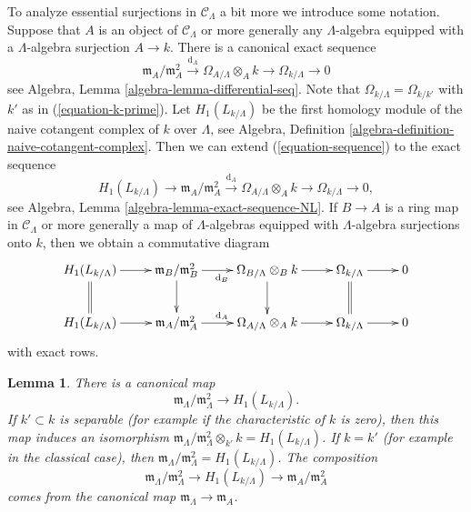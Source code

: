 \documentclass{stacks-project}
\theoremstyle{plain}
\newtheorem{lemma}[subsection]{Lemma}
\theoremstyle{definition}
\theoremstyle{remark}
\numberwithin{equation}{subsection}
\begin{document}
\noindent
To analyze essential surjections in $\mathcal{C}_\Lambda$ a bit more
we introduce some notation. Suppose that $A$ is an object
of $\mathcal{C}_\Lambda$ or more generally any $\Lambda$-algebra
equipped with a $\Lambda$-algebra surjection $A \to k$.
There is a canonical exact sequence
\begin{equation}
\label{equation-sequence}
\mathfrak m_A/\mathfrak m_A^2 \xrightarrow{\text{d}_A}
\Omega_{A/\Lambda} \otimes_A k \to
\Omega_{k/\Lambda} \to 0
\end{equation}
see
Algebra, Lemma \ref{algebra-lemma-differential-seq}.
Note that $\Omega_{k/\Lambda} = \Omega_{k/k'}$ with $k'$ as
in (\ref{equation-k-prime}). Let $H_1(L_{k/\Lambda})$
be the first homology module of the naive cotangent complex of $k$
over $\Lambda$, see
Algebra, Definition \ref{algebra-definition-naive-cotangent-complex}.
Then we can extend (\ref{equation-sequence})
to the exact sequence
\begin{equation}
\label{equation-sequence-extended}
H_1(L_{k/\Lambda}) \to
\mathfrak m_A/\mathfrak m_A^2 \xrightarrow{\text{d}_A}
\Omega_{A/\Lambda} \otimes_A k \to
\Omega_{k/\Lambda} \to 0,
\end{equation}
see
Algebra, Lemma \ref{algebra-lemma-exact-sequence-NL}.
If $B \to A$ is a ring map in $\mathcal{C}_\Lambda$
or more generally a map of $\Lambda$-algebras equipped
with $\Lambda$-algebra surjections onto $k$, then we obtain a
commutative diagram
\begin{equation}
\label{equation-sequence-functorial}
\vcenter{
\xymatrix{
H_1(L_{k/\Lambda}) \ar[r] \ar@{=}[d] &
\mathfrak m_B/\mathfrak m_B^2 \ar[r]_{\text{d}_B} \ar[d] &
\Omega_{B/\Lambda} \otimes_B k \ar[r] \ar[d] &
\Omega_{k/\Lambda} \ar[r] \ar@{=}[d] & 0 \\
H_1(L_{k/\Lambda}) \ar[r] &
\mathfrak m_A/\mathfrak m_A^2 \ar[r]^{\text{d}_A} &
\Omega_{A/\Lambda} \otimes_A k \ar[r] &
\Omega_{k/\Lambda} \ar[r] & 0
}
}
\end{equation}
with exact rows.

\begin{lemma}
\label{lemma-H1-separable-case}
There is a canonical map
$$
\mathfrak m_\Lambda/\mathfrak m_\Lambda^2 \longrightarrow H_1(L_{k/\Lambda}).
$$
If $k' \subset k$ is separable (for example if the characteristic
of $k$ is zero), then this map induces an isomorphism
$\mathfrak m_\Lambda/\mathfrak m_\Lambda^2 \otimes_{k'} k = H_1(L_{k/\Lambda})$.
If $k = k'$ (for example in the classical case), then
$\mathfrak m_\Lambda/\mathfrak m_\Lambda^2 = H_1(L_{k/\Lambda})$.
The composition
$$
\mathfrak m_\Lambda/\mathfrak m_\Lambda^2 \longrightarrow
H_1(L_{k/\Lambda}) \longrightarrow \mathfrak m_A/\mathfrak m_A^2
$$
comes from the canonical map $\mathfrak m_\Lambda \to \mathfrak m_A$.
\end{lemma}
\end{document}
